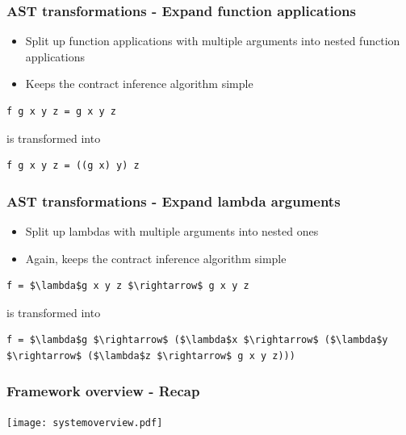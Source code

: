 \documentclass[]{beamer}
\begin{document}
\begin{frame}[fragile]
\frametitle{AST transformations - Expand function applications}

\begin{itemize}
	\item Split up function applications with multiple arguments into nested function applications
	\item Keeps the contract inference algorithm simple
\end{itemize}

\begin{lstlisting}
f g x y z = g x y z
\end{lstlisting}

is transformed into

\begin{lstlisting}
f g x y z = ((g x) y) z
\end{lstlisting}

\end{frame}

\begin{frame}[fragile]
\frametitle{AST transformations - Expand lambda arguments}

\begin{itemize}
	\item Split up lambdas with multiple arguments into nested ones
	\item Again, keeps the contract inference algorithm simple
\end{itemize}

\begin{lstlisting}[mathescape]
f = $\lambda$g x y z $\rightarrow$ g x y z
\end{lstlisting}

is transformed into

\begin{lstlisting}[mathescape]
f = $\lambda$g $\rightarrow$ ($\lambda$x $\rightarrow$ ($\lambda$y $\rightarrow$ ($\lambda$z $\rightarrow$ g x y z)))
\end{lstlisting}

\end{frame}

\begin{frame}
\frametitle{Framework overview - Recap}

\begin{center}
\texttt{[image: systemoverview.pdf]}
\end{center}

\end{frame}
\end{document}
